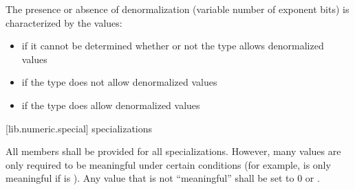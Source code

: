 \pnum
The presence or absence of denormalization (variable number of exponent bits)
is characterized by the values:

\begin{itemize}
\item
{}%
if it cannot be determined whether or not the type allows denormalized values
\item
{}%
if the type does not allow denormalized values
\item
{}%
if the type does allow denormalized values
\end{itemize}

[lib.numeric.special]{ specializations}

\pnum
All members shall be provided for all specializations.
However, many values are only required to be meaningful under certain
conditions
(for example,
is only meaningful if
is
).
Any value that is not ``meaningful'' shall be set to 0 or
.

